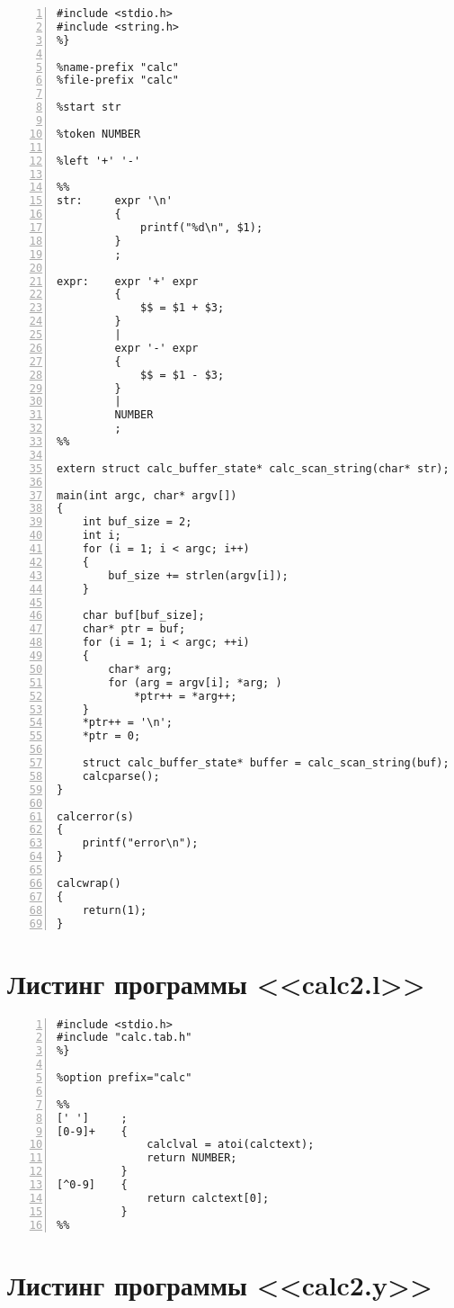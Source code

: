 \documentclass[bachelor, och, coursework, times]{SCWorks}
\begin{document}
\begin{Verbatim}[fontsize=\small, numbers=left]
%{
#include <stdio.h>
#include <string.h>
%}

%name-prefix "calc"
%file-prefix "calc"

%start str

%token NUMBER

%left '+' '-'

%%   
str:     expr '\n'
         {
             printf("%d\n", $1);
         }
         ;

expr:    expr '+' expr
         {
             $$ = $1 + $3;
         }
         |
         expr '-' expr
         {
             $$ = $1 - $3;
         }
         |
         NUMBER
         ;       
%%

extern struct calc_buffer_state* calc_scan_string(char* str);

main(int argc, char* argv[])
{
	int buf_size = 2;
	int i;
	for (i = 1; i < argc; i++)
	{
		buf_size += strlen(argv[i]);
	}

	char buf[buf_size];
	char* ptr = buf;
	for (i = 1; i < argc; ++i)
	{
		char* arg;
		for (arg = argv[i]; *arg; )
			*ptr++ = *arg++;
	}
	*ptr++ = '\n';
	*ptr = 0;

	struct calc_buffer_state* buffer = calc_scan_string(buf);
	calcparse();
}

calcerror(s)
{
	printf("error\n");
}

calcwrap()
{
	return(1);
}
\end{Verbatim}



\section{Листинг программы <<calc2.l>>}\label{pril-4}

\begin{Verbatim}[fontsize=\small, numbers=left]
%{
#include <stdio.h>
#include "calc.tab.h"
%}

%option prefix="calc"

%%
[' ']     ;
[0-9]+    {
              calclval = atoi(calctext);
              return NUMBER;
          }
[^0-9]    {             
              return calctext[0]; 
          }
%%
\end{Verbatim}

\section{Листинг программы <<calc2.y>>}\label{pril-5}
\end{document}
